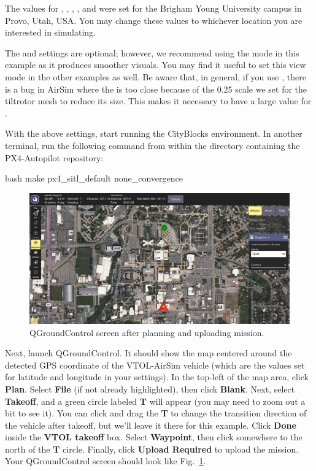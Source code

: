 The values for , , , , and  were set for the Brigham Young University campus in Provo, Utah, USA. You may change these values to whichever location you are interested in simulating.

The  and  settings are optional; however, we recommend using the  mode in this example as it produces smoother visuals. You may find it useful to set this view mode in the other examples as well. Be aware that, in general, if you use , there is a bug in AirSim where the  is too close because of the 0.25 scale we set for the tiltrotor mesh to reduce its size. This makes it necessary to have a large value for .

With the above settings, start running the CityBlocks environment. In another terminal, run the following command from within the directory containing the PX4-Autopilot repository:
\begin{minttcb}[title={}]{bash}
make px4_sitl_default none_convergence
\end{minttcb}

\begin{figure}[h]
    \centering
    \includegraphics[width=\textwidth]{figures/qgroundcontrol_crop}
    \caption[QGroundControl showing mission plan]{
        QGroundControl screen after planning and uploading mission.}%
    \label{fig:qgroundcontrol}
\end{figure}

Next, launch QGroundControl. It should show the map centered around the detected GPS coordinate of the VTOL-AirSim vehicle (which are the values set for latitude and longitude in your settings). In the top-left of the map area, click \textbf{Plan}. Select \textbf{File} (if not already highlighted), then click \textbf{Blank}. Next, select \textbf{Takeoff}, and a green circle labeled \textbf{T} will appear (you may need to zoom out a bit to see it). You can click and drag the \textbf{T} to change the transition direction of the vehicle after takeoff, but we'll leave it there for this example. Click \textbf{Done} inside the \textbf{VTOL takeoff} box. Select \textbf{Waypoint}, then click somewhere to the north of the \textbf{T} circle. Finally, click \textbf{Upload Required} to upload the mission.  Your QGroundControl screen should look like Fig.~\ref{fig:qgroundcontrol}.

